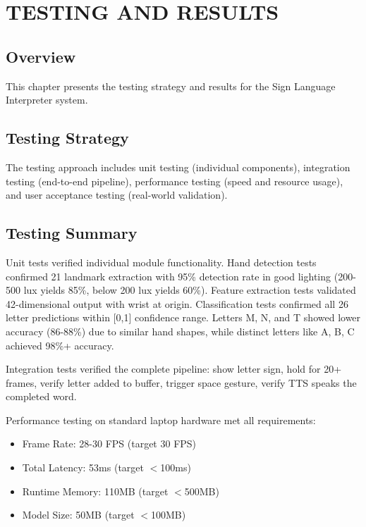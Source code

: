 \chapter{TESTING AND RESULTS} \label{c6}
\justifying

\section{Overview}

This chapter presents the testing strategy and results for the Sign Language Interpreter system.

\vspace{1em}
\section{Testing Strategy}

The testing approach includes unit testing (individual components), integration testing (end-to-end pipeline), performance testing (speed and resource usage), and user acceptance testing (real-world validation).

\vspace{1em}
\section{Testing Summary}

Unit tests verified individual module functionality. Hand detection tests confirmed 21 landmark extraction with 95\% detection rate in good lighting (200-500 lux yields 85\%, below 200 lux yields 60\%). Feature extraction tests validated 42-dimensional output with wrist at origin. Classification tests confirmed all 26 letter predictions within [0,1] confidence range. Letters M, N, and T showed lower accuracy (86-88\%) due to similar hand shapes, while distinct letters like A, B, C achieved 98\%+ accuracy.

Integration tests verified the complete pipeline: show letter sign, hold for 20+ frames, verify letter added to buffer, trigger space gesture, verify TTS speaks the completed word.

Performance testing on standard laptop hardware met all requirements:

\begin{itemize}
    \item Frame Rate: 28-30 FPS (target 30 FPS)
    \item Total Latency: 53ms (target $<$100ms)
    \item Runtime Memory: 110MB (target $<$500MB)
    \item Model Size: 50MB (target $<$100MB)
\end{itemize}


